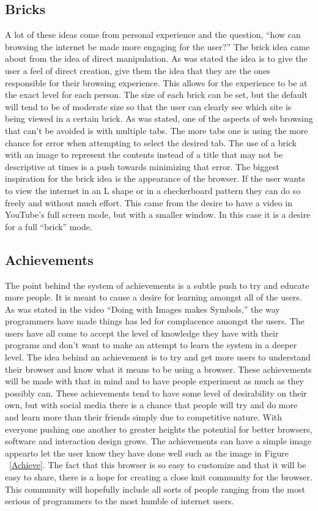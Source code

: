 \documentclass[11pt]{article}
\begin{document}
\subsection{Bricks}
A lot of these ideas come from personal experience and the question, “how can browsing the internet be made more engaging for the user?” The brick idea came about from the idea of direct manipulation. As was stated the idea is to give the user a feel of direct creation, give them the idea that they are the ones responsible for their browsing experience. This allows for the experience to be at the exact level for each person. The size of each brick can be set, but the default will tend to be of moderate size so that the user can clearly see which site is being viewed in a certain brick. As was stated, one of the aspects of web browsing that can’t be avoided is with multiple tabs. The more tabs one is using the more chance for error when attempting to select the desired tab. The use of a brick with an image to represent the contents instead of a title that may not be descriptive at times is a push towards minimizing that error. The biggest inspiration for the brick idea is the appearance of the browser. If the user wants to view the internet in an L shape or in a checkerboard pattern they can do so freely and without much effort. This came from the desire to have a video in YouTube’s full screen mode, but with a smaller window. In this case it is a desire for a full “brick” mode. 

\subsection{Achievements}
The point behind the system of achievements is a subtle push to try and educate more people. It is meant to cause a desire for learning amongst all of the users. As was stated in the video “Doing with Images makes Symbols,” the way programmers have made things has led for complacence amongst the users. The users have all come to accept the level of knowledge they have with their programs and don’t want to make an attempt to learn the system in a deeper level. The idea behind an achievement is to try and get more users to understand their browser and know what it means to be using a browser. These achievements will be made with that in mind and to have people experiment as much as they possibly can. These achievements tend to have some level of desirability on their own, but with social media there is a chance that people will try and do more and learn more than their friends simply due to competitive nature. With everyone pushing one another to greater heights the potential for better browsers, software and interaction design grows. The achievements can have a simple image appearto let the user know they have done well such as the image in Figure  ~\ref{Achieve}. The fact that this browser is so easy to customize and that it will be easy to share, there is a hope for creating a close knit community for the browser. This community will hopefully include all sorts of people ranging from the most serious of programmers to the most humble of internet users.
\end{document}
